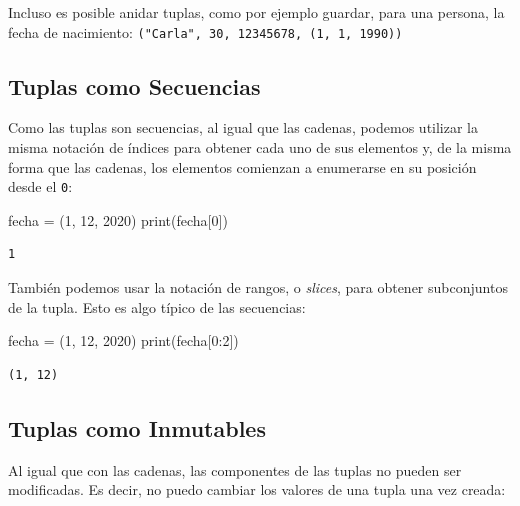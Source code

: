 \documentclass[
  letterpaper,
  DIV=11,
  numbers=noendperiod]{scrreprt}
\newenvironment{Shaded}{\begin{snugshade}}{\end{snugshade}}
\newcommand{\BuiltInTok}[1]{\textcolor[rgb]{0.00,0.23,0.31}{#1}}
\newcommand{\DecValTok}[1]{\textcolor[rgb]{0.68,0.00,0.00}{#1}}
\newcommand{\NormalTok}[1]{\textcolor[rgb]{0.00,0.23,0.31}{#1}}
\newcommand{\OperatorTok}[1]{\textcolor[rgb]{0.37,0.37,0.37}{#1}}
\begin{document}
Incluso es posible anidar tuplas, como por ejemplo guardar, para una
persona, la fecha de nacimiento:
\texttt{("Carla",\ 30,\ 12345678,\ (1,\ 1,\ 1990))}

\hypertarget{tuplas-como-secuencias}{%
\subsection{Tuplas como Secuencias}\label{tuplas-como-secuencias}}

Como las tuplas son secuencias, al igual que las cadenas, podemos
utilizar la misma notación de índices para obtener cada uno de sus
elementos y, de la misma forma que las cadenas, los elementos comienzan
a enumerarse en su posición desde el \texttt{0}:

\begin{Shaded}
\begin{Highlighting}[]
\NormalTok{fecha }\OperatorTok{=}\NormalTok{ (}\DecValTok{1}\NormalTok{, }\DecValTok{12}\NormalTok{, }\DecValTok{2020}\NormalTok{)}
\BuiltInTok{print}\NormalTok{(fecha[}\DecValTok{0}\NormalTok{])}
\end{Highlighting}
\end{Shaded}

\begin{verbatim}
1
\end{verbatim}

También podemos usar la notación de rangos, o \emph{slices}, para
obtener subconjuntos de la tupla. Esto es algo típico de las secuencias:

\begin{Shaded}
\begin{Highlighting}[]
\NormalTok{fecha }\OperatorTok{=}\NormalTok{ (}\DecValTok{1}\NormalTok{, }\DecValTok{12}\NormalTok{, }\DecValTok{2020}\NormalTok{)}
\BuiltInTok{print}\NormalTok{(fecha[}\DecValTok{0}\NormalTok{:}\DecValTok{2}\NormalTok{])}
\end{Highlighting}
\end{Shaded}

\begin{verbatim}
(1, 12)
\end{verbatim}

\hypertarget{tuplas-como-inmutables}{%
\subsection{Tuplas como Inmutables}\label{tuplas-como-inmutables}}

Al igual que con las cadenas, las componentes de las tuplas no pueden
ser modificadas. Es decir, no puedo cambiar los valores de una tupla una
vez creada:
\end{document}
